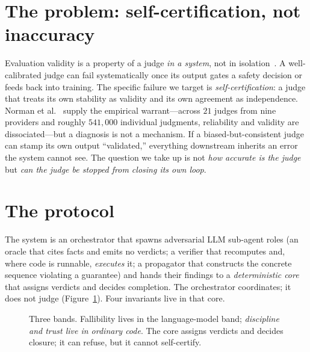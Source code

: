 \documentclass{article}
\begin{document}
\section{The problem: self-certification, not inaccuracy}
Evaluation validity is a property of a judge \emph{in a system}, not in isolation~\cite{judge2026}. A
well-calibrated judge can fail systematically once its output gates a safety decision or feeds back into
training. The specific failure we target is \emph{self-certification}: a judge that treats its own
stability as validity and its own agreement as independence. Norman et al.~\cite{norman2026reliability}
supply the empirical warrant---across $21$ judges from nine providers and roughly $541{,}000$ individual
judgments, reliability and validity are dissociated---but a diagnosis is not a mechanism. If a
biased-but-consistent judge can stamp its own output ``validated,'' everything downstream inherits an
error the system cannot see. The question we take up is not \emph{how accurate is the judge} but
\emph{can the judge be stopped from closing its own loop}.

\section{The protocol}
The system is an orchestrator that spawns adversarial LLM sub-agent roles (an oracle that cites facts and
emits no verdicts; a verifier that recomputes and, where code is runnable, \emph{executes} it; a
propagator that constructs the concrete sequence violating a guarantee) and hands their findings to a
\emph{deterministic core} that assigns verdicts and decides completion. The orchestrator coordinates; it
does not judge (Figure~\ref{fig:bands}). Four invariants live in that core.

\begin{figure}[t]
\centering
{}
\caption{Three bands. Fallibility lives in the language-model band; \emph{discipline and trust live in
ordinary code}. The core assigns verdicts and decides closure; it can refuse, but it cannot self-certify.}
\label{fig:bands}
\end{figure}
\end{document}

